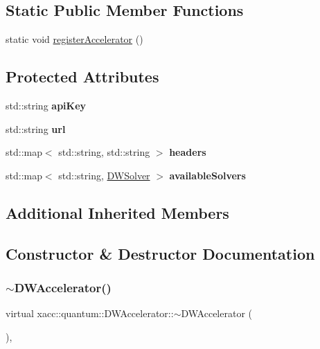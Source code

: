 \subsection*{Static Public Member Functions}
\begin{DoxyCompactItemize}
\item 
static void \hyperlink{a01133_aece856713312dd2c882eee12392b04fa}{register\+Accelerator} ()
\end{DoxyCompactItemize}
\subsection*{Protected Attributes}
\begin{DoxyCompactItemize}
\item 
\mbox{\label{a01133_a6b9ca421d7efeed09ff9acb9f77d9dd8}} 
std\+::string {\bfseries api\+Key}
\item 
\mbox{\label{a01133_a934db80f3cf6aa68158a66bc053c0c27}} 
std\+::string {\bfseries url}
\item 
\mbox{\label{a01133_a031df31e3ff84f33ea9a76bfc0f9277c}} 
std\+::map$<$ std\+::string, std\+::string $>$ {\bfseries headers}
\item 
\mbox{\label{a01133_ac19954e3df9e77184717c9be8a2ed4c5}} 
std\+::map$<$ std\+::string, \hyperlink{a01129}{D\+W\+Solver} $>$ {\bfseries available\+Solvers}
\end{DoxyCompactItemize}
\subsection*{Additional Inherited Members}


\subsection{Constructor \& Destructor Documentation}
\mbox{\label{a01133_ad06f92a271d445c2a1ff8364faa3617b}} 
\subsubsection{\texorpdfstring{$\sim$\+D\+W\+Accelerator()}{~DWAccelerator()}}
{\footnotesize\ttfamily virtual xacc\+::quantum\+::\+D\+W\+Accelerator\+::$\sim$\+D\+W\+Accelerator (\begin{DoxyParamCaption}{ }\end{DoxyParamCaption})\hspace{0.3cm}{\ttfamily [inline]}, {\ttfamily [virtual]}}

